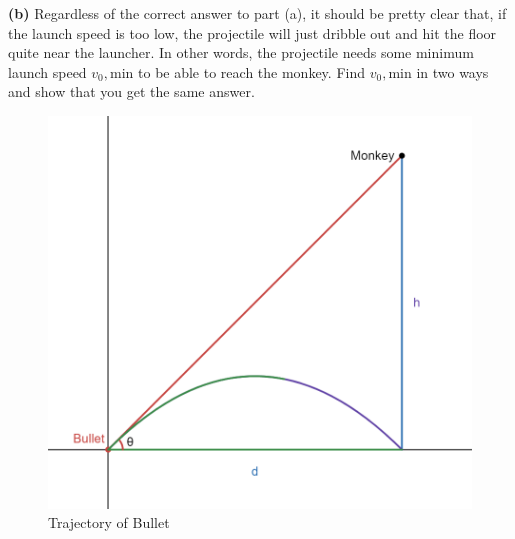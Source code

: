 \documentclass[12pt]{article}
\begin{document}
\textbf{(b)} Regardless of the correct answer to part (a), it should be pretty clear that, if the launch speed is too low, the projectile will just dribble out and hit the floor quite near the launcher. In other words, the projectile needs some minimum launch speed \(v_0, \text{min}\) to be able to reach the monkey. Find \(v_0, \text{min}\) in two ways and show that you get the same answer.
\begin{figure}[!h]
    \centering
    \includegraphics[width=0.5\linewidth]{Pictures/PS00/monkey_v2.png}
    \caption{Trajectory of Bullet}
    \label{fig:01-2b}
\end{figure}
\end{document}
